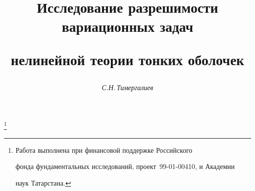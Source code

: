 

 




 


\newcommand{\const}{\operatorname{const}} 


\newcommand{\im}{\operatorname{Im}} 


\newcommand{\re}{\operatorname{Re}} 


\newcommand{\grad}{\operatorname{grad}} 


\newcommand{\tts}[1]{} 


\renewcommand{\baselinestretch}{1.03}


 




\setcounter{page}{66} 












 


\author{\it С.Н.\,Тимергалиев} 




\title{Исследование разрешимости вариационных задач 


нелинейной теории тонких оболочек} 


\thanks{Работа выполнена при финансовой поддержке Российского 


фонда фундаментальных исследований, проект \No\,99-01-00410, и Академии  


наук Татарстана.} 


 


\date{} 




